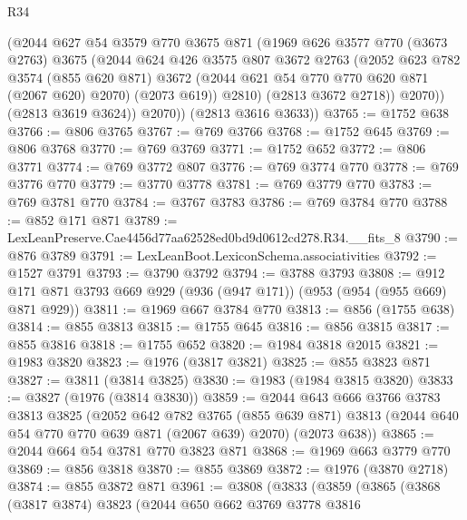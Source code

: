 \begin{lexlean}{R34}
\begin{coremodule}
              (@2044
                @627
                @54
                @3579
                @770
                @3675
                @871
                (@1969
                  @626
                  @3577
                  @770
                  (@3673 @2763)
                  @3675
                  (@2044
                    @624
                    @426
                    @3575
                    @807
                    @3672
                    @2763
                    (@2052
                      @623
                      @782
                      @3574
                      (@855 @620 @871)
                      @3672
                      (@2044 @621 @54 @770 @770 @620 @871 (@2067 @620) @2070)
                      (@2073 @619))
                    @2810)
                  (@2813 @3672 @2718))
                @2070))
            (@2813 @3619 @3624))
          @2070))
      (@2813 @3616 @3633))
@3765 := @1752 @638
@3766 := @806 @3765
@3767 := @769 @3766
@3768 := @1752 @645
@3769 := @806 @3768
@3770 := @769 @3769
@3771 := @1752 @652
@3772 := @806 @3771
@3774 := @769 @3772 @807
@3776 := @769 @3774 @770
@3778 := @769 @3776 @770
@3779 := @3770 @3778
@3781 := @769 @3779 @770
@3783 := @769 @3781 @770
@3784 := @3767 @3783
@3786 := @769 @3784 @770
@3788 := @852 @171 @871
@3789 := LexLeanPreserve.Cae4456d77aa62528ed0bd9d0612cd278.R34.__fits_8
@3790 := @876 @3789
@3791 := LexLeanBoot.LexiconSchema.associativities
@3792 := @1527 @3791
@3793 := @3790 @3792
@3794 := @3788 @3793
@3808 := @912 @171 @871 @3793 @669 @929 (@936 (@947 @171)) (@953 (@954 (@955 @669) @871 @929))
@3811 := @1969 @667 @3784 @770
@3813 := @856 (@1755 @638)
@3814 := @855 @3813
@3815 := @1755 @645
@3816 := @856 @3815
@3817 := @855 @3816
@3818 := @1755 @652
@3820 := @1984 @3818 @2015
@3821 := @1983 @3820
@3823 := @1976 (@3817 @3821)
@3825 := @855 @3823 @871
@3827 := @3811 (@3814 @3825)
@3830 := @1983 (@1984 @3815 @3820)
@3833 := @3827 (@1976 (@3814 @3830))
@3859 := @2044
    @643
    @666
    @3766
    @3783
    @3813
    @3825
    (@2052
      @642
      @782
      @3765
      (@855 @639 @871)
      @3813
      (@2044 @640 @54 @770 @770 @639 @871 (@2067 @639) @2070)
      (@2073 @638))
@3865 := @2044 @664 @54 @3781 @770 @3823 @871
@3868 := @1969 @663 @3779 @770
@3869 := @856 @3818
@3870 := @855 @3869
@3872 := @1976 (@3870 @2718)
@3874 := @855 @3872 @871
@3961 := @3808
    (@3833
      (@3859
        (@3865
          (@3868
            (@3817 @3874)
            @3823
            (@2044
              @650
              @662
              @3769
              @3778
              @3816

\end{coremodule}
\end{lexlean}
